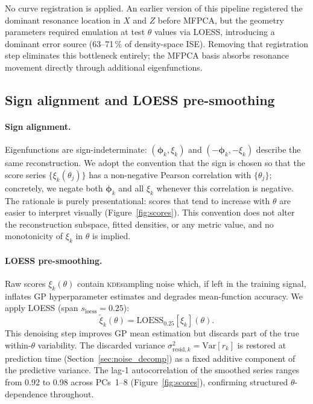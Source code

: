 \documentclass[12pt,a4paper]{article}
\newcommand{\KDE}{\textsc{kde}}
\newcommand{\spar}{\theta}
\begin{document}
No curve registration is applied.  An earlier version of this pipeline
registered the dominant resonance location in $X$ and $Z$ before
MFPCA, but the geometry parameters required emulation at test $\spar$
values via LOESS, introducing a dominant error source (63--71\,\% of
density-space ISE).  Removing that registration step eliminates this
bottleneck entirely; the MFPCA basis absorbs resonance movement
directly through additional eigenfunctions.

\subsection{Sign alignment and LOESS pre-smoothing}
\label{sec:sign}

\paragraph{Sign alignment.}
Eigenfunctions are sign-indeterminate: $(\boldsymbol{\phi}_k,\xi_k)$
and $(-\boldsymbol{\phi}_k,-\xi_k)$ describe the same reconstruction.
We adopt the convention that the sign is chosen so that the score
series $\{\xi_k(\theta_j)\}$ has a non-negative Pearson correlation
with $\{\theta_j\}$; concretely, we negate both $\boldsymbol{\phi}_k$
and all $\xi_k$ whenever this correlation is negative.  The rationale
is purely presentational: scores that tend to increase with $\spar$
are easier to interpret visually (Figure~\ref{fig:scores}).  This
convention does not alter the reconstruction subspace, fitted densities,
or any metric value, and no monotonicity of $\xi_k$ in $\spar$ is
implied.

\paragraph{LOESS pre-smoothing.}
Raw scores $\xi_k(\spar)$ contain \KDE sampling noise which, if left
in the training signal, inflates GP hyperparameter estimates and
degrades mean-function accuracy.  We apply LOESS (span
$s_\mathrm{loess}=0.25$):
\begin{equation}
  \tilde{\xi}_k(\spar)=\mathrm{LOESS}_{0.25}[\xi_k](\spar).
  \label{eq:loess}
\end{equation}
This denoising step improves GP mean estimation but discards part of
the true within-$\spar$ variability.  The discarded variance
$\sigma^2_{\mathrm{resid},k}=\mathrm{Var}[r_k]$ is restored at
prediction time (Section~\ref{sec:noise_decomp}) as a fixed additive component
of the predictive variance.
The lag-1 autocorrelation of the smoothed series ranges from 0.92 to
0.98 across PCs~1--8
(Figure~\ref{fig:scores}), confirming structured $\spar$-dependence
throughout.
\end{document}
